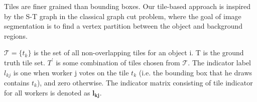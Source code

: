 \documentclass[letterpaper]{article} %
\begin{document}
Tiles are finer grained than bounding boxes. Our tile-based approach is inspired by the S-T graph in the classical graph cut problem, where the goal of image segmentation is to find a vertex partition between the object and background regions.

\par $\mathcal{T}=\{t_k\}$ is the set of all non-overlapping tiles for an object i. T is the ground truth tile set. $T^\prime$ is some combination of tiles chosen from $\mathcal{T}$.
 The indicator label $l_{kj}$ is one when worker j votes on the tile $t_{k}$ (i.e. the bounding box that he draws contains $t_{k}$), and zero otherwise. The indicator matrix consisting of tile indicator for all workers is denoted as $\mathbf{l_{kj}}$.
\end{document}
